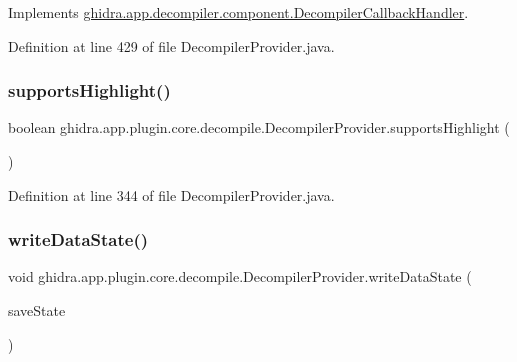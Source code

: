 Implements \mbox{\hyperlink{interfaceghidra_1_1app_1_1decompiler_1_1component_1_1_decompiler_callback_handler_af7aab35a0989733d8f7731a18aa4ea52}{ghidra.\+app.\+decompiler.\+component.\+Decompiler\+Callback\+Handler}}.



Definition at line 429 of file Decompiler\+Provider.\+java.

\mbox{\label{classghidra_1_1app_1_1plugin_1_1core_1_1decompile_1_1_decompiler_provider_ad741dde6f2290fad9cb1e7ed0e83893d}} 
\subsubsection{\texorpdfstring{supportsHighlight()}{supportsHighlight()}}
{\footnotesize\ttfamily boolean ghidra.\+app.\+plugin.\+core.\+decompile.\+Decompiler\+Provider.\+supports\+Highlight (\begin{DoxyParamCaption}{ }\end{DoxyParamCaption})\hspace{0.3cm}{\ttfamily [inline]}}



Definition at line 344 of file Decompiler\+Provider.\+java.

\mbox{\label{classghidra_1_1app_1_1plugin_1_1core_1_1decompile_1_1_decompiler_provider_afb67ba4cd117c62a268993e9cdf9a9db}} 
\subsubsection{\texorpdfstring{writeDataState()}{writeDataState()}}
{\footnotesize\ttfamily void ghidra.\+app.\+plugin.\+core.\+decompile.\+Decompiler\+Provider.\+write\+Data\+State (\begin{DoxyParamCaption}\item[{Save\+State}]{save\+State }\end{DoxyParamCaption})\hspace{0.3cm}{\ttfamily [inline]}}




